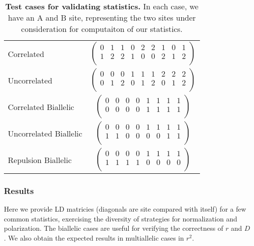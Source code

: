\documentclass[12pt]{article}
\begin{document}
\begin{table}[H]
\begin{tabular}{lc}
    \hline
    Correlated & $\left(\begin{array}{ccccccccc}
                          0 & 1 & 1 & 0 & 2 & 2 & 1 & 0 & 1 \\
                          1 & 2 & 2 & 1 & 0 & 0 & 2 & 1 & 2 \\
                        \end{array}\right)$ \\
    Uncorrelated & $\left(\begin{array}{ccccccccc}
                            0 & 0 & 0 & 1 & 1 & 1 & 2 & 2 & 2 \\
                            0 & 1 & 2 & 0 & 1 & 2 & 0 & 1 & 2 \\
                          \end{array}\right)$ \\
    Correlated Biallelic & $\left(\begin{array}{cccccccc}
                                    0 & 0 & 0 & 0 & 1 & 1 & 1 & 1 \\
                                    0 & 0 & 0 & 0 & 1 & 1 & 1 & 1 \\
                                  \end{array}\right)$ \\
    Uncorrelated Biallelic & $\left(\begin{array}{cccccccc}
                                      0 & 0 & 0 & 0 & 1 & 1 & 1 & 1 \\
                                      1 & 1 & 0 & 0 & 0 & 0 & 1 & 1 \\
                                    \end{array}\right)$ \\
    Repulsion Biallelic & $\left(\begin{array}{cccccccc}
                                   0 & 0 & 0 & 0 & 1 & 1 & 1 & 1 \\
                                   1 & 1 & 1 & 1 & 0 & 0 & 0 & 0 \\
                                 \end{array}\right)$ \\
  \end{tabular}
  \caption{
    \textbf{Test cases for validating statistics.}
    In each case, we have an A and B site, representing the two sites under
    consideration for computaiton of our statistics.
  }
  \label{table:test_cases}
\end{table}

\subsubsection{Results}
Here we provide LD matricies (diagonals are site compared with itself) for a few
common statistics, exercising the diversity of strategies for normalization and
polarization. The biallelic cases are useful for verifying the correctness of
$r$ and $D$. We also obtain the expected results in multiallelic cases in $r^2$.
\end{document}
